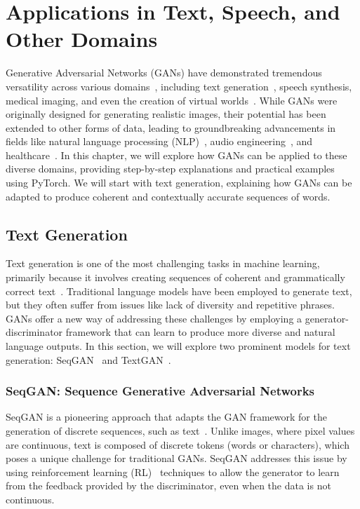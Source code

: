 \chapter{Applications in Text, Speech, and Other Domains}

Generative Adversarial Networks (GANs) have demonstrated tremendous versatility across various domains~\cite{yang2022wavegan}, including text generation~\cite{de2021survey}, speech synthesis, medical imaging, and even the creation of virtual worlds~\cite{li2024survey}. While GANs were originally designed for generating realistic images, their potential has been extended to other forms of data, leading to groundbreaking advancements in fields like natural language processing (NLP)~\cite{hirschberg2015advances}, audio engineering~\cite{zwicker1991audio}, and healthcare~\cite{murmu2024reliable}. In this chapter, we will explore how GANs can be applied to these diverse domains, providing step-by-step explanations and practical examples using PyTorch. We will start with text generation, explaining how GANs can be adapted to produce coherent and contextually accurate sequences of words.

\section{Text Generation}

Text generation is one of the most challenging tasks in machine learning, primarily because it involves creating sequences of coherent and grammatically correct text~\cite{lin2019commongen}. Traditional language models have been employed to generate text, but they often suffer from issues like lack of diversity and repetitive phrases. GANs offer a new way of addressing these challenges by employing a generator-discriminator framework that can learn to produce more diverse and natural language outputs. In this section, we will explore two prominent models for text generation: SeqGAN~\cite{yu2017seqgan} and TextGAN~\cite{zhang2017adversarial}.

\subsection{SeqGAN: Sequence Generative Adversarial Networks}

SeqGAN is a pioneering approach that adapts the GAN framework for the generation of discrete sequences, such as text~\cite{yu2017seqgan}. Unlike images, where pixel values are continuous, text is composed of discrete tokens (words or characters), which poses a unique challenge for traditional GANs. SeqGAN addresses this issue by using reinforcement learning (RL)~\cite{kaelbling1996reinforcement} techniques to allow the generator to learn from the feedback provided by the discriminator, even when the data is not continuous.

